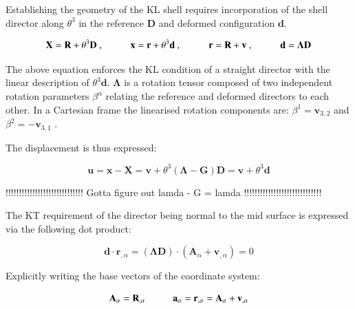 Establishing the geometry of the KL shell requires incorporation of the shell director along $\theta^3$ in the reference $\mathbf{D}$ and deformed configuration $\mathbf{d}$.

\begin{equation} 
\mathbf{X} = \mathbf{R} + \theta^3 \mathbf{D}\ ,
\hspace{10mm}
\mathbf{x} = \mathbf{r} + \theta^3 \mathbf{d}\ ,
\hspace{10mm}
\mathbf{r} = \mathbf{R} + \mathbf{v}\ ,
\hspace{10mm}
\mathbf{d} = \boldsymbol{\Lambda}  \mathbf{D}
\label{eqskt1}
\end{equation}

The above equation enforces the KL condition of a straight director with the linear description of $\theta^3 \mathbf{d}$. $\boldsymbol{\Lambda}$ is a rotation tensor composed of two independent rotation parameters $\beta^\alpha$ relating the reference and deformed directors to each other. In a Cartesian frame the linearised rotation components are: $\beta^1 = \mathbf{v}_{3,2}$ and $\beta^2 = -\mathbf{v}_{3,1}$ \cite{BischLitBook04}.

The displacement is thus expressed:

\begin{equation} 
\mathbf{u} = \mathbf{x} - \mathbf{X}
=
\mathbf{v} + \theta^3 (\boldsymbol{\Lambda} - \mathbf{G}) \mathbf{D}
=
\mathbf{v} + \theta^3 \mathbf{d}
\label{eqskt2}
\end{equation}

!!!!!!!!!!!!!!!!!!!!!!!!!!!!!
Gotta figure out lamda - G = lamda
!!!!!!!!!!!!!!!!!!!!!!!!!!!!!

The KT requirement of the director being normal to the mid surface is expressed via the following dot product:

\begin{equation} 
\mathbf{d} \cdot \mathbf{r}_{,\alpha}
=
(\boldsymbol{\Lambda} \mathbf{D}) \cdot (\mathbf{A}_\alpha + \mathbf{v}_{,\alpha})
=
0
\label{eqskt3}
\end{equation}

Explicitly writing the base vectors of the coordinate system:

\begin{equation} 
\mathbf{A}_\alpha  = \mathbf{R}_{,\alpha}
\hspace{10mm}
\mathbf{a}_\alpha  = \mathbf{r}_{,\alpha} = \mathbf{A}_\alpha + \mathbf{v}_{,\alpha}
\label{eqskt4}
\end{equation}

